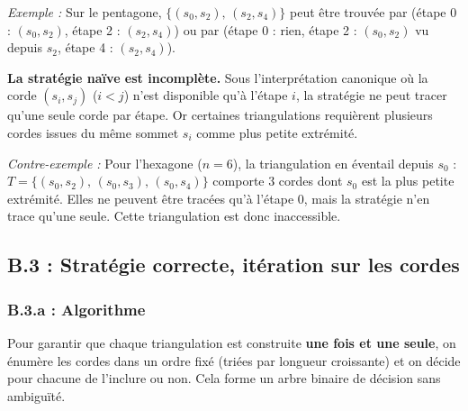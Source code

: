 \documentclass[12pt,a4paper]{article}
\begin{document}
\textit{Exemple :} Sur le pentagone, $\{(s_0,s_2),\,(s_2,s_4)\}$ peut être trouvée par
(étape 0 : $(s_0,s_2)$, étape 2 : $(s_2,s_4)$) ou par (étape 0 : rien, étape 2 :
$(s_0,s_2)$ vu depuis $s_2$, étape 4 : $(s_2,s_4)$).

\textbf{La stratégie naïve est incomplète.} Sous l'interprétation canonique où la corde
$(s_i, s_j)$ ($i < j$) n'est disponible qu'à l'étape $i$, la stratégie ne peut tracer
qu'une seule corde par étape.  Or certaines triangulations requièrent plusieurs cordes
issues du même sommet $s_i$ comme plus petite extrémité.

\textit{Contre-exemple :} Pour l'hexagone ($n=6$), la triangulation en éventail depuis
$s_0$ : $T = \{(s_0,s_2),\,(s_0,s_3),\,(s_0,s_4)\}$ comporte 3 cordes dont $s_0$ est la
plus petite extrémité.  Elles ne peuvent être tracées qu'à l'étape 0, mais la stratégie
n'en trace qu'une seule.  Cette triangulation est donc inaccessible.

\clearpage
\subsection{B.3 : Stratégie correcte, itération sur les cordes}

\subsubsection*{B.3.a : Algorithme}

Pour garantir que chaque triangulation est construite \textbf{une fois et une seule}, on
énumère les cordes dans un ordre fixé (triées par longueur croissante) et on décide pour
chacune de l'inclure ou non. Cela forme un arbre binaire de décision sans ambiguïté.
\end{document}
